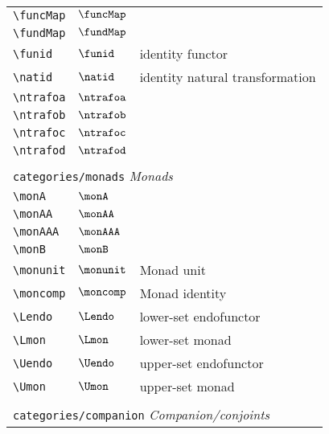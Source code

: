 \begin{longtable}{lll}
 {\color[rgb]{0.5,0.5,0.5}\texttt{\textbackslash funcMap}} & $\funcMap$ & \\ 
 {\color[rgb]{0.5,0.5,0.5}\texttt{\textbackslash fundMap}} & $\fundMap$ & \\ 
 {\color[rgb]{0.5,0.5,0.5}\texttt{\textbackslash funid}} & $\funid$ &  identity functor\\ 
 {\color[rgb]{0.5,0.5,0.5}\texttt{\textbackslash natid}} & $\natid$ &  identity natural transformation\\ 
 {\color[rgb]{0.5,0.5,0.5}\texttt{\textbackslash ntrafoa}} & $\ntrafoa$ & \\ 
 {\color[rgb]{0.5,0.5,0.5}\texttt{\textbackslash ntrafob}} & $\ntrafob$ & \\ 
 {\color[rgb]{0.5,0.5,0.5}\texttt{\textbackslash ntrafoc}} & $\ntrafoc$ & \\ 
 {\color[rgb]{0.5,0.5,0.5}\texttt{\textbackslash ntrafod}} & $\ntrafod$ & \\ 
  &  & \\ 
 \multicolumn{3}{l}{{\color[rgb]{0.5,0.5,0.5}\texttt{categories/monads}} \emph{Monads}}\\ 
 \hline
{\color[rgb]{0.5,0.5,0.5}\texttt{\textbackslash monA}} & $\monA$ & \\ 
 {\color[rgb]{0.5,0.5,0.5}\texttt{\textbackslash monAA}} & $\monAA$ & \\ 
 {\color[rgb]{0.5,0.5,0.5}\texttt{\textbackslash monAAA}} & $\monAAA$ & \\ 
 {\color[rgb]{0.5,0.5,0.5}\texttt{\textbackslash monB}} & $\monB$ & \\ 
 {\color[rgb]{0.5,0.5,0.5}\texttt{\textbackslash monunit}} & $\monunit$ &  Monad unit\\ 
 {\color[rgb]{0.5,0.5,0.5}\texttt{\textbackslash moncomp}} & $\moncomp$ &  Monad identity\\ 
 {\color[rgb]{0.5,0.5,0.5}\texttt{\textbackslash Lendo}} & $\Lendo$ &  lower-set endofunctor\\ 
 {\color[rgb]{0.5,0.5,0.5}\texttt{\textbackslash Lmon}} & $\Lmon$ &  lower-set monad\\ 
 {\color[rgb]{0.5,0.5,0.5}\texttt{\textbackslash Uendo}} & $\Uendo$ &  upper-set endofunctor\\ 
 {\color[rgb]{0.5,0.5,0.5}\texttt{\textbackslash Umon}} & $\Umon$ &  upper-set monad\\ 
  &  & \\ 
 \multicolumn{3}{l}{{\color[rgb]{0.5,0.5,0.5}\texttt{categories/companion}} \emph{Companion/conjoints}}\\ 

\end{longtable}

